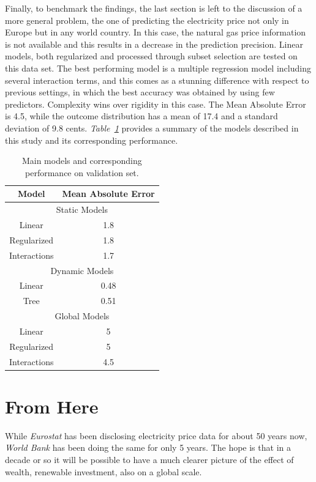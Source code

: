\documentclass[a4paper,12pt]{book}
\begin{document}
Finally, to benchmark the findings, the last section is left to the discussion of a more general problem, the one of predicting the electricity price not only in Europe but in any world country. In this case, the natural gas price information is not available and this results in a decrease in the prediction precision. Linear models, both regularized and processed through subset selection are tested on this data set. The best performing model is a multiple regression model including several interaction terms, and this comes as a stunning difference with respect to previous settings, in which the best accuracy was obtained by using few predictors. Complexity wins over rigidity in this case. The Mean Absolute Error is 4.5, while the outcome distribution has a mean of 17.4 and a standard deviation of 9.8 cents. \textit{Table~\ref{Tab:final}} provides a summary of the models described in this study and its corresponding performance.

\begin{table}[tb]
\begin{center}
\begin{tabular}{|c|c|}
\hline
Model&Mean Absolute Error\\
\hline
\multicolumn{2}{|c|}{Static Models}\\
\hline
Linear&1.8\\
Regularized&1.8\\
Interactions&1.7\\
\hline
\multicolumn{2}{|c|}{Dynamic Models}\\
\hline
Linear&0.48\\
Tree&0.51\\
\hline
\multicolumn{2}{|c|}{Global Models}\\
\hline
Linear&5\\
Regularized&5\\
Interactions&4.5\\
\hline
\end{tabular}
\caption{Main models and corresponding performance on validation set.}
\label{Tab:final}
\end{center}
\end{table}

\section{From Here}

While \textit{Eurostat} has been disclosing electricity price data for about 50 years now, \textit{World Bank} has been doing the same for only 5 years. The hope is that in a decade or so it will be possible to have a much clearer picture of the effect of wealth, renewable investment, also on a global scale.
\end{document}
